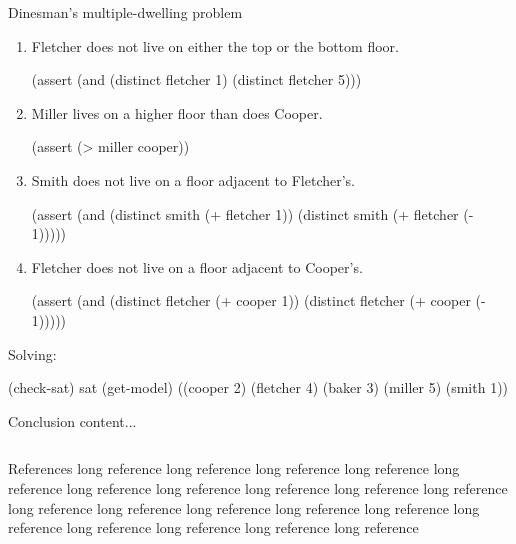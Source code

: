 \documentclass{beamer}
\begin{document}
\begin{frame}[fragile,t]
\begin{columns}[t,onlytextwidth]
\begin{column}{0.485\textwidth}
\begin{block}{Dinesman's multiple-dwelling problem}
\begin{enumerate}
				\item Fletcher does not live on either the top or the bottom floor.
				\begin{smtlib}
					(assert (and (distinct fletcher 1)
					             (distinct fletcher 5)))
				\end{smtlib}
			
				\item Miller lives on a higher floor than does Cooper.
				\begin{smtlib}
					(assert (> miller cooper))
				\end{smtlib}
			
				\item Smith does not live on a floor adjacent to Fletcher's.
				\begin{smtlib}
					(assert (and (distinct smith (+ fletcher 1))
					             (distinct smith (+ fletcher (- 1)))))
				\end{smtlib}
			
				\item Fletcher does not live on a floor adjacent to Cooper's.
				\begin{smtlib}
					(assert (and (distinct fletcher (+ cooper 1))
					             (distinct fletcher (+ cooper (- 1)))))
				\end{smtlib}
			\end{enumerate}
		
			Solving:
			\begin{smtlib}
				(check-sat)
				sat
				(get-model)
				((cooper 2) (fletcher 4) (baker 3) (miller 5) (smith 1))
			\end{smtlib}
		\end{block}
	
		\begin{block}{Conclusion}
			content...
		\end{block}
	
	\end{column}
\end{columns}

\vspace{0.5em}

\begin{block}{References}
	long reference long reference long reference long reference long reference long reference long reference long reference long reference long reference long reference long reference long reference long reference long reference long reference long reference long reference long reference long reference 
\end{block}

\end{frame}
\end{document}
